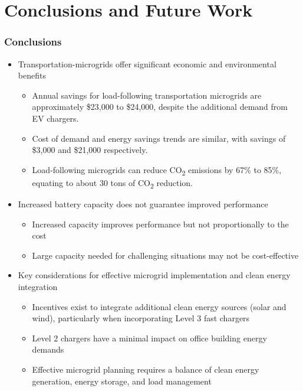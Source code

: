 \documentclass[aspectratio=169, 8 pt]{beamer}
\begin{document}
	\section{Conclusions and Future Work}		
	
	\begin{frame}
		\frametitle{Conclusions}
		\begin{itemize} \Large
			\item Transportation-microgrids offer significant economic and environmental benefits
			\begin{itemize} \large
				\item Annual savings for load-following transportation microgrids are approximately \$23,000 to \$24,000, despite the additional demand from EV chargers.
				\item Cost of demand and energy savings trends are similar, with savings of \$3,000 and \$21,000 respectively.
				\item Load-following microgrids can reduce CO\textsubscript{2} emissions by 67\% to 85\%, equating to about 30 tons of CO\textsubscript{2} reduction.
			\end{itemize}
			\item Increased battery capacity does not guarantee improved performance
			\begin{itemize} \large
				\item Increased capacity improves performance but not proportionally to the cost
				\item Large capacity needed for challenging situations may not be cost-effective 
			\end{itemize}
			\item Key considerations for effective microgrid implementation and clean energy integration
			\begin{itemize} \large
				\item Incentives exist to integrate additional clean energy sources (solar and wind), particularly when incorporating Level 3 fast chargers
				\item Level 2 chargers have a minimal impact on office building energy demands
				\item Effective microgrid planning requires a balance of clean energy generation, energy storage, and load management
			\end{itemize}
		\end{itemize}
	\end{frame}
\end{document}

